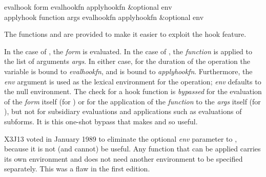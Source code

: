 \begin{defun}[Function]
evalhook form evalhookfn applyhookfn &optional env \\
applyhook function args evalhookfn applyhookfn &optional env

The functions  and  are provided to make it
easier to exploit the hook feature.

In the case of , the {\it form} is evaluated.
In the case of , the {\it function} is applied to the
list of arguments {\it args}.  In either case,
for the duration of the operation
the variable  is bound to {\it evalhookfn}, and
 is bound to {\it applyhookfn}.
Furthermore, the {\it env} argument
is used as the lexical environment for the operation;
{\it env} defaults to the null environment.
The check for a hook function is {\it bypassed} for the evaluation
of the {\it form} itself (for ) or for the application
of the {\it function} to the {\it args} itself (for ),
but not for subsidiary evaluations and applications
such as evaluations of subforms.  It is this one-shot bypass that makes
 and  so useful.

\begin{new}
X3J13 voted in January 1989
to eliminate the optional {\it env}
parameter to , because it is not (and cannot)
be useful.  Any function that can be applied carries its own
environment and does not need another environment to be specified
separately.
This was a flaw in the first edition.
\end{new}


\end{defun}
